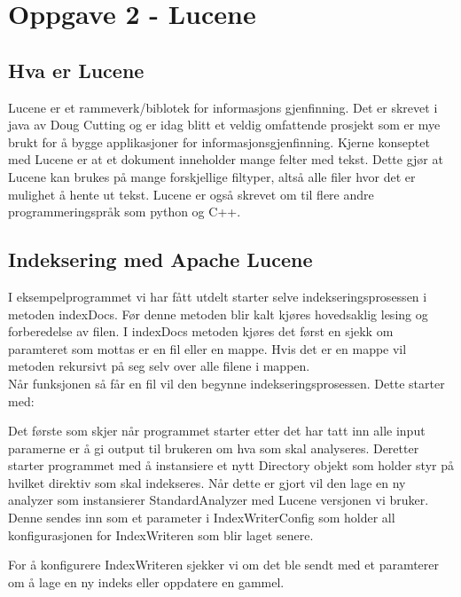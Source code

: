 \lstset{language=Java,
numberstyle=\footnotesize,
basicstyle=\ttfamily\footnotesize,
frame=shadowbox,
breaklines=true}


\section*{Oppgave 2 - Lucene}

\subsection*{Hva er Lucene}
Lucene er et rammeverk/biblotek for informasjons gjenfinning. Det er skrevet i java av Doug Cutting og er idag blitt et veldig omfattende prosjekt som er mye brukt for å bygge applikasjoner for informasjonsgjenfinning. Kjerne konseptet med Lucene er at et dokument inneholder mange felter med tekst. Dette gjør at Lucene kan brukes på mange forskjellige filtyper, altså alle filer hvor det er mulighet å hente ut tekst. Lucene er også skrevet om til flere andre programmeringspråk som python og C++.

\subsection*{Indeksering med Apache Lucene}
I eksempelprogrammet vi har fått utdelt starter selve indekseringsprosessen i metoden indexDocs. Før denne metoden blir kalt kjøres hovedsaklig lesing og forberedelse av filen.
I indexDocs metoden kjøres det først en sjekk om paramteret som mottas er en fil eller en mappe. Hvis det er en mappe vil metoden rekursivt på seg selv over alle filene i mappen.\\
Når funksjonen så får en fil vil den begynne indekseringsprosessen. Dette starter med:


Det første som skjer når programmet starter etter det har tatt inn alle input paramerne er å gi output til brukeren om hva som skal analyseres. Deretter starter programmet med å instansiere et nytt Directory objekt som holder styr på hvilket direktiv som skal indekseres. Når dette er gjort vil den lage en ny analyzer som instansierer StandardAnalyzer med Lucene versjonen vi bruker. Denne sendes inn som et parameter i IndexWriterConfig som holder all konfigurasjonen for IndexWriteren som blir laget senere.


For å konfigurere IndexWriteren sjekker vi om det ble sendt med et paramterer om å lage en ny indeks eller oppdatere en gammel.


